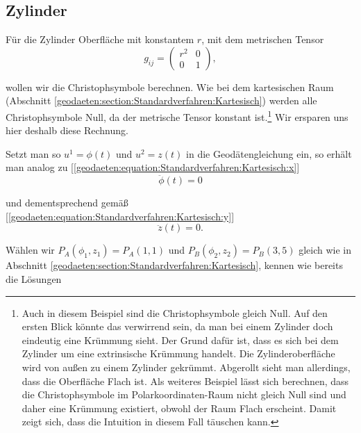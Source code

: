 %
%
%
%
\subsection{Zylinder\label{geodaeten:section:Standardverfahren:Zylinder}}

Für die Zylinder Oberfläche mit konstantem $r$, mit dem metrischen Tensor 
\begin{equation}
	g_{ij} = \begin{pmatrix} 
		r^2 & 0 \\ 
		0 & 1 
	\end{pmatrix},
\end{equation}

wollen wir die Christophsymbole berechnen. 
Wie bei dem kartesischen Raum (Abschnitt \ref{geodaeten:section:Standardverfahren:Kartesisch}) werden alle Christophsymbole Null, da der metrische Tensor konstant ist.\footnote{
Auch in diesem Beispiel sind die Christophsymbole gleich Null.
Auf den ersten Blick könnte das verwirrend sein, da man bei einem Zylinder doch eindeutig eine Krümmung sieht.
Der Grund dafür ist, dass es sich bei dem Zylinder um eine extrinsische Krümmung handelt.
Die Zylinderoberfläche wird von außen zu einem Zylinder gekrümmt.
Abgerollt sieht man allerdings, dass die Oberfläche Flach ist.
Als weiteres Beispiel lässt sich berechnen, dass die Christophsymbole im Polarkoordinaten-Raum nicht gleich Null sind und daher eine Krümmung existiert, obwohl der Raum Flach erscheint.
Damit zeigt sich, dass die Intuition in diesem Fall täuschen kann.
}
Wir ersparen uns hier deshalb diese Rechnung.

Setzt man so $u^1 = \phi (t)$ und $u^2 = z(t)$ in die Geodätengleichung ein, so erhält man analog zu [\ref{geodaeten:equation:Standardverfahren:Kartesisch:x}]
\begin{equation}
	\ddot{\phi}(t) = 0
	\label{geodaeten:equation:Standardverfahren:Zylinder:phi}
\end{equation}

und dementsprechend gemäß [\ref{geodaeten:equation:Standardverfahren:Kartesisch:y}] 
\begin{equation}
	\ddot{z}(t) = 0 .
\end{equation}

Wählen wir $P_A(\phi_1 , z_1) = P_A(1 , 1)$ und $P_B(\phi_2 , z_2) = P_B(3 , 5)$ gleich wie in Abschnitt \ref{geodaeten:section:Standardverfahren:Kartesisch}, kennen wie bereits die Lösungen

